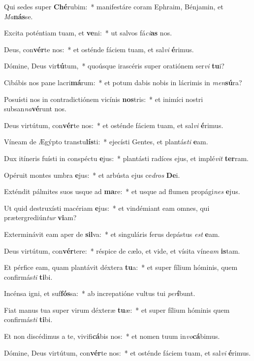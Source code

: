 \item Qui sedes super \textbf{Ché}rubim:~* manifestáre coram Ephraim, Bénjamin, et \textit{Ma}\textbf{nás}se.
\item Excita poténtiam tuam, et \textbf{ve}ni:~* ut salvos fá\textit{ci}\textbf{as} nos.
\item Deus, con\textbf{vér}te nos:~* et osténde fáciem tuam, et sal\textit{vi} \textbf{é}rimus.
\item Dómine, Deus vir\textbf{tú}tum,~* quoúsque irascéris super oratiónem ser\textit{vi} \textbf{tu}i?
\item Cibábis nos pane lacri\textbf{má}rum:~* et potum dabis nobis in lácrimis in \textit{men}\textbf{sú}ra?
\item Posuísti nos in contradictiónem vicínis \textbf{nos}tris:~* et inimíci nostri subsan\textit{na}\textbf{vé}runt nos.
\item Deus virtútum, con\textbf{vér}te nos:~* et osténde fáciem tuam, et sal\textit{vi} \textbf{é}rimus.
\item Víneam de Ægýpto transtu\textbf{lís}ti:~* ejecísti Gentes, et plantás\textit{ti} \textbf{e}am.
\item Dux itíneris fuísti in conspéctu \textbf{e}jus:~* plantásti radíces ejus, et implé\textit{vit} \textbf{ter}ram.
\item Opéruit montes umbra \textbf{e}jus:~* et arbústa ejus ce\textit{dros} \textbf{De}i.
\item Exténdit pálmites suos usque ad \textbf{ma}re:~* et usque ad flumen propági\textit{nes} \textbf{e}jus.
\item Ut quid destruxísti macériam \textbf{e}jus:~* et vindémiant eam omnes, qui prætergrediún\textit{tur} \textbf{vi}am?
\item Exterminávit eam aper de \textbf{sil}va:~* et singuláris ferus depástus \textit{est} \textbf{e}am.
\item Deus virtútum, con\textbf{vér}tere:~* réspice de cælo, et vide, et vísita víne\textit{am} \textbf{is}tam.
\item Et pérfice eam, quam plantávit déxtera \textbf{tu}a:~* et super fílium hóminis, quem confirmás\textit{ti} \textbf{ti}bi.
\item Incénsa igni, et suf\textbf{fós}sa:~* ab increpatióne vultus tui \textit{per}\textbf{í}bunt.
\item Fiat manus tua super virum déxteræ \textbf{tu}æ:~* et super fílium hóminis quem confirmás\textit{ti} \textbf{ti}bi.
\item Et non discédimus a te, vivifi\textbf{cá}bis nos:~* et nomen tuum in\textit{vo}\textbf{cá}bimus.
\item Dómine, Deus virtútum, con\textbf{vér}te nos:~* et osténde fáciem tuam, et sal\textit{vi} \textbf{é}rimus.
